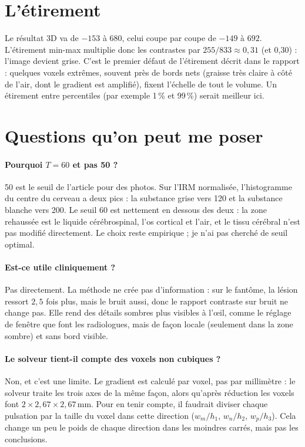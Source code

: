 \documentclass[11pt,a4paper]{article}
\begin{document}
\section{L'étirement}

Le résultat 3D va de $-153$ à $680$, celui coupe par coupe de $-149$ à $692$. L'étirement min-max
multiplie donc les contrastes par $255/833\approx0{,}31$ (et 0,30) : l'image devient grise. C'est le
premier défaut de l'étirement décrit dans le rapport : quelques voxels extrêmes, souvent près de bords
nets (graisse très claire à côté de l'air, dont le gradient est amplifié), fixent l'échelle de tout le
volume. Un étirement entre percentiles (par exemple 1\,\% et 99\,\%) serait meilleur ici.

\section{Questions qu'on peut me poser}

\paragraph{Pourquoi $T=60$ et pas 50 ?} 50 est le seuil de l'article pour des photos. Sur l'IRM
normalisée, l'histogramme du centre du cerveau a deux pics : la substance grise vers 120 et la substance
blanche vers 200. Le seuil 60 est nettement en dessous des deux : la zone rehaussée est le liquide
cérébrospinal, l'os cortical et l'air, et le tissu cérébral n'est pas modifié directement. Le choix reste
empirique ; je n'ai pas cherché de seuil optimal.

\paragraph{Est-ce utile cliniquement ?} Pas directement. La méthode ne crée pas d'information : sur le
fantôme, la lésion ressort $2{,}5$ fois plus, mais le bruit aussi, donc le rapport contraste sur bruit ne
change pas. Elle rend des détails sombres plus visibles à l'œil, comme le réglage de fenêtre que font les
radiologues, mais de façon locale (seulement dans la zone sombre) et sans bord visible.

\paragraph{Le solveur tient-il compte des voxels non cubiques ?} Non, et c'est une limite. Le gradient est
calculé par voxel, pas par millimètre : le solveur traite les trois axes de la même façon, alors qu'après
réduction les voxels font $2\times2{,}67\times2{,}67$\,mm. Pour en tenir compte, il faudrait diviser
chaque pulsation par la taille du voxel dans cette direction ($w_m/h_1$, $w_n/h_2$, $w_p/h_3$). Cela
change un peu le poids de chaque direction dans les moindres carrés, mais pas les conclusions.
\end{document}
